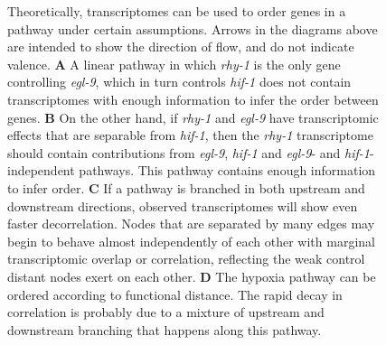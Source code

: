 \documentclass[9pt,twocolumn,twoside]{pnas-new}
\newcommand{\egl}{\emph{egl-9}}
\newcommand{\rhy}{\emph{rhy-1}}
\newcommand{\hif}{\emph{hif-1}}
\newcommand{\fog}{\emph{fog-2}}
\begin{document}
\begin{figure}[tbhp]
\caption{
Theoretically, transcriptomes can be used to order genes in a pathway under
certain assumptions. Arrows in the diagrams above are intended to show the
direction of flow, and do not indicate valence.
\textbf{A} A linear pathway in which \rhy{} is the only gene controlling \egl{},
which in turn controls \hif{} does not contain transcriptomes with enough
information to infer the order between genes.
\textbf{B} On the other hand, if \rhy{} and \egl{} have transcriptomic effects
that are separable from \hif{}, then the \rhy{} transcriptome should contain
contributions from \egl{}, \hif{} and \egl{}- and \hif{}-independent pathways.
This pathway contains enough information to infer order.
\textbf{C} If a pathway is branched in both upstream and downstream directions,
observed transcriptomes will show even faster decorrelation. Nodes that are
separated by many edges may begin to behave almost independently of each other
with marginal transcriptomic overlap or correlation, reflecting the weak control
distant nodes exert on each other.
\textbf{D} The hypoxia pathway can be ordered according to functional distance.
The rapid decay in correlation is probably due to a mixture of upstream and
downstream branching that happens along this pathway.
}
\label{fig:decorrelation}
\end{figure}
\end{document}
